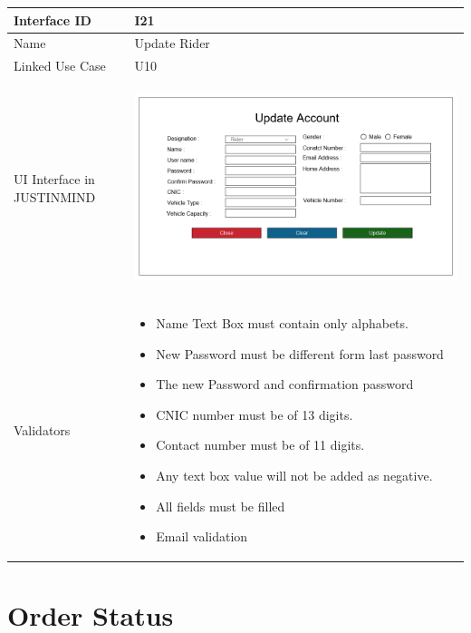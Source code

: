 \documentclass[12pt,a4paper]{report}
\begin{document}
\begin{tabular}{ | m{3cm} | m{12cm}| } \hline

Interface ID &  I21 \\\hline

Name  &  Update Rider \\ \hline

Linked Use Case & U10 \\ \hline

UI Interface in JUSTINMIND & \begin{center} \includegraphics[scale=0.3]{./UIs for Latex Reports/UI-021 UpdateRider@1x.png}\end{center}  \\ \hline

Validators & 
\begin{itemize}
\item   Name Text Box must contain only alphabets.
\item  New Password must be different form last password
\item  The new Password and confirmation password
\item  CNIC number must be of 13 digits.
\item  Contact number must be of 11 digits.
\item  Any text box value will not be added as negative.
\item  All fields must be filled
\item  Email validation


\end{itemize}
\\ \hline

\end{tabular} 
\section{Order Status }
\end{document}
